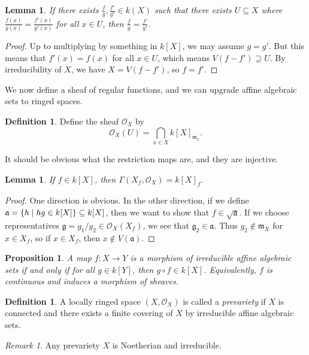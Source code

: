 \documentclass[leqno, openany]{memoir}
\newtheorem{prop}[thm]{Proposition}
\newtheorem{lem}[thm]{Lemma}
\theoremstyle{definition}
\newtheorem{defn}[thm]{Definition}
\theoremstyle{remark}
\newtheorem{rmk}[thm]{Remark}
\theoremstyle{plain}
\theoremstyle{definition}
\theoremstyle{remark}
\newcommand{\mc}[1]{\mathcal{#1}}
\newcommand{\mf}[1]{\mathfrak{#1}}
\begin{document}
\begin{lem} If there exists $\frac{f}{g}, \frac{f'}{g'} \in k(X)$ such that
there exists $U \subseteq X$ where $\frac{f(x)}{g(x)} = \frac{f'(x)}{g'(x)}$
for all $x \in U$, then $\frac{f}{g} = \frac{f'}{g'}$.  \end{lem}

\begin{proof} Up to multiplying by something in $k[X]$, we may assume $g = g'$.
But this means that $f'(x) = f(x)$ for all $x \in U$, which means $V(f-f')
\supseteq U$. By irreducibility of $X$, we have $X = V(f-f')$, so $f = f'$.
\end{proof}

We now define a sheaf of regular functions, and we can upgrade affine algebraic
sets to ringed spaces.

\begin{defn} Define the sheaf $\mc{O}_X$ by \[ \mc{O}_X(U) = \bigcap_{x \in X}
{k[X]}_{\mf{m}_x}. \] \end{defn} It should be obvious what the restriction maps
are, and they are injective.

\begin{lem} If $f \in k[X]$, then $\Gamma(X_f, \mc{O}_X) = {k[X]}_f$.
\end{lem}

\begin{proof} One direction is obvious. In the other direction, if we define
    $\mf{a} = \qty{h \mid h g \in k[X]} \subseteq k[X]$, then we want to show
    that $f \in \sqrt{\mf{a}}$. If we choose representatives $\mf{g} = g_1 /
    g_2 \in \mc{O}_X(X_f)$, we see that $\mf{g}_2 \in \mf{a}$. Thus $g_2 \notin
    \mf{m}_X$ for $x \in X_f$, so if $x \in X_f$, then $x \notin V(\mf{a})$.
\end{proof}

\begin{prop} A map $f \colon X \to Y$ is a morphism of irreducible affine
algebraic sets if and only if for all $g \in k[Y]$, then $g \circ f \in k[X]$.
Equivalently, $f$ is continuous and induces a morphism of sheaves.  \end{prop}

\begin{defn} A locally ringed space $(X, \mc{O}_X)$ is called a
\textit{prevariety} if $X$ is connected and there exists a finite covering of
$X$ by irreducible affine algebraic sets.  \end{defn}

\begin{rmk} Any prevariety $X$ is Noetherian and irreducible.  \end{rmk}
\end{document}
